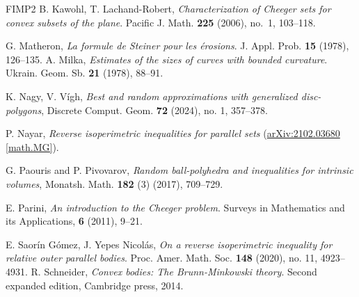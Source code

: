 \documentclass[11pt, oneside]{amsart}
\theoremstyle{theorem}
\theoremstyle{Intro}
\theoremstyle{definition}
\theoremstyle{remark}
\theoremstyle{claim}
\numberwithin{equation}{section}
\begin{document}
\begin{thebibliography}{FIMP2}
B. Kawohl, T. Lachand-Robert, \emph{Characterization of Cheeger sets for convex subsets of the plane}. Pacific J. Math. \textbf{225} (2006), no.~1, 103--118.
%

%
G. Matheron, \emph{La formule de Steiner pour les \'erosions}. J. Appl. Prob. {\bf15} (1978), 126--135.
%
A. Milka, \emph{Estimates of the sizes of curves with bounded curvature}. Ukrain. Geom. Sb. \textbf{21} (1978), 88--91. 
%


K. Nagy, V. V\'igh, \emph{Best and random approximations with generalized disc-polygons}, Discrete Comput. Geom. {\bf72} (2024), no. 1, 357--378. 

P. Nayar, \textit{Reverse isoperimetric inequalities for parallel sets} (\href{https://arxiv.org/abs/2102.03680}{arXiv:2102.03680 [math.MG]}).

%
%


 G. Paouris and P. Pivovarov, \emph{Random ball-polyhedra and inequalities for intrinsic volumes}, Monatsh. Math. {\bf 182} (3) (2017), 709--729.

E. Parini, \emph{An introduction to the Cheeger problem}. Surveys in Mathematics and its Applications, \textbf{6} (2011), 9--21.

%

%

E. Saor\'in G\'omez, J. Yepes Nicol\'as, \emph{On a reverse isoperimetric inequality for relative outer parallel bodies}. Proc. Amer. Math. Soc. \textbf{148} (2020), no. 11, 4923--4931.
%
%
 R. Schneider, \emph{Convex bodies: The Brunn-Minkowski theory}. Second expanded edition, Cambridge press, 2014.




\end{thebibliography}
\end{document}
